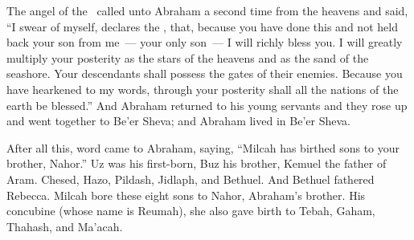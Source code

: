 \begin{inparaenum}
   The angel of the \lord\ called unto Abraham a second time from the heavens%
   and said, ``I swear of myself, declares the \lord, that, because you have done this and not held back your son from me\understood~--- your only son~---%
   I will richly bless you. I will greatly multiply your posterity as the stars of the heavens and as the sand of the seashore. Your descendants shall possess the gates of their enemies.%
   Because you have hearkened to my words, through your posterity shall all the nations of the earth be blessed.''%
   And Abraham returned to his young servants and they rose up and went together to Be'er Sheva; and Abraham lived in Be'er Sheva.%
  
   After all this, word came to Abraham, saying, ``Milcah has birthed sons to your brother, Nahor.''%
   Uz was his first-born, Buz his brother, Kemuel the father of Aram.%
   Chesed, Hazo, Pildash, Jidlaph, and Bethuel.%
   And Bethuel fathered Rebecca. Milcah bore these eight sons to Nahor, Abraham's brother.%
   His concubine (whose name is Reumah), she also gave birth to Tebah, Gaham, Thahash, and Ma'acah.%
\end{inparaenum}
